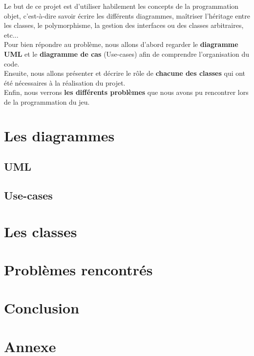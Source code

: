 \documentclass[12,french]{report}
\begin{document}
Le but de ce projet est d'utiliser habilement les concepts de la programmation objet, c'est-à-dire savoir écrire les différents diagrammes, maîtriser l'héritage entre les classes, le polymorphisme, la gestion des interfaces ou des classes arbitraires, etc...\\

Pour bien répondre au problème, nous allons d'abord regarder le \textbf{diagramme UML} et le \textbf{diagramme de cas} (Use-cases) afin de comprendre l'organisation du code.\\

Ensuite, nous allons présenter et décrire le rôle de \textbf{chacune des classes} qui ont été nécessaires à la réalisation du projet.\\

Enfin, nous verrons \textbf{les différents problèmes} que nous avons pu rencontrer lors de la programmation du jeu.


\chapter{Les diagrammes}

\section{UML}

\section{Use-cases}

\chapter{Les classes}

\chapter{Problèmes rencontrés}

\chapter*{Conclusion}

\chapter*{Annexe}
\end{document}
